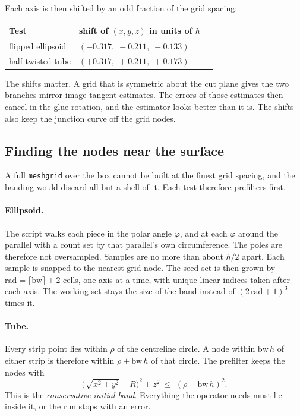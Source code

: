 Each axis is then shifted by an odd fraction of the grid spacing:
\begin{center}
\begin{tabular}{lll}
  \toprule
  Test & shift of $(x,y,z)$ in units of $h$ \\
  \midrule
  flipped ellipsoid & $(-0.317,\; -0.211,\; -0.133)$ \\
  half-twisted tube & $(+0.317,\; +0.211,\; +0.173)$ \\
  \bottomrule
\end{tabular}
\end{center}
The shifts matter. A grid that is symmetric about the cut plane gives the
two branches mirror-image tangent estimates. The errors of those
estimates then cancel in the glue rotation, and the estimator looks
better than it is. The shifts also keep the junction curve off the grid
nodes.

\subsection{Finding the nodes near the surface}

A full \texttt{meshgrid} over the box cannot be built at the finest grid
spacing, and the banding would discard all but a shell of it. Each test
therefore prefilters first.

\paragraph{Ellipsoid.} The script walks each piece in the polar angle
$\varphi$, and at each $\varphi$ around the parallel with a count set by
that parallel's own circumference. The poles are therefore not
oversampled. Samples are no more than about $h/2$ apart. Each sample is
snapped to the nearest grid node. The seed set is then grown by
$\mathrm{rad}=\lceil \mathrm{bw}\rceil+2$ cells, one axis at a time, with
unique linear indices taken after each axis. The working set stays the
size of the band instead of $(2\,\mathrm{rad}+1)^3$ times it.

\paragraph{Tube.} Every strip point lies within $\rho$ of the centreline
circle. A node within $\mathrm{bw}\,h$ of either strip is therefore
within $\rho+\mathrm{bw}\,h$ of that circle. The prefilter keeps the
nodes with
\begin{equation}
  \bigl(\sqrt{x^2+y^2}-R\bigr)^2 + z^2
  \;\le\; (\rho + \mathrm{bw}\,h)^2 .
\end{equation}
This is the \emph{conservative initial band}. Everything the operator
needs must lie inside it, or the run stops with an error.

